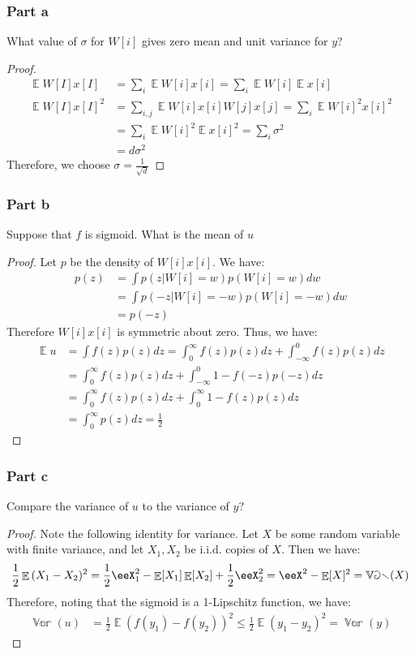 \documentclass{amsart}
\DeclareMathOperator{\Var}{\mathbb{Var}}  %
\DeclareMathOperator{\ee}{\mathbb{E}}
\theoremstyle{definition}
\begin{document}
\subsubsection*{Part a} What value of $\sigma$ for $W[i]$ gives zero mean and unit variance for $y$?
\begin{proof}
  \begin{align*}
    \ee{W[I]x[I]} &= \sum_{i} \ee{W[i]x[i]} = \sum_{i} \ee{W[i]}\ee{x[i]}\\
    \ee{W[I]x[I]^2} &= \sum_{i,j} \ee{W[i]x[i]W[j]x[j]} = \sum_{i} \ee{W[i]^2x[i]^2} \\
    &= \sum_{i} \ee{W[i]^2}\ee{x[i]^2} = \sum_{i} \sigma^2\\
    &= d \sigma^2
  \end{align*}
  Therefore, we choose $\sigma = \frac1{\sqrt{d}}$
\end{proof}
\subsubsection*{Part b} Suppose that $f$ is sigmoid. What is the mean of $u$
\begin{proof}
  Let $p$ be the density of $W[i]x[i]$. We have:
  \begin{align*}
    p(z) &= \int p(z | W[i] = w) p(W[i] = w) dw \\
    &= \int p(-z | W[i] = - w) p(W[i] = -w) dw \\
    &= p(-z)
  \end{align*}
  Therefore $W[i]x[i]$ is symmetric about zero. Thus, we have:
  \begin{align*}
    \ee{u} &= \int f(z) p(z) dz  = \int_0^\infty f(z) p(z) dz + \int_{-\infty}^0 f(z) p(z) dz \\ 
    &= \int_0^\infty f(z) p(z) dz + \int_{-\infty}^ 0 1 - f(-z) p(-z) dz \\
    &= \int_0^\infty f(z) p(z) dz + \int_0^\infty 1 - f(z) p(z) dz \\
    &= \int_0^\infty p(z) dz = \frac12
  \end{align*}
\end{proof}

\subsubsection*{Part c} Compare the variance of $u$ to the variance of $y$?
\begin{proof}
  Note the following identity for variance. Let $X$ be some random variable with finite variance, and let $X_1, X_2$ be i.i.d. copies of $X$. Then we have:
  \[
  \frac12 \ee{(X_1 - X_2)^2 } = \frac12 \eeX_1^2 - \ee[X_1]\ee[X_2] + \frac12 \eeX_2^2 = \eeX^2 - \ee[X]^2 = \Var(X)
  \]
  Therefore, noting that the sigmoid is a 1-Lipschitz function, we have:
  \begin{align*}
    \Var(u) &= \frac12 \ee{(f(y_1) - f(y_2))^2} \le \frac12 \ee{(y_1 - y_2)^2} = \Var(y)
  \end{align*}
\end{proof}
\end{document}

